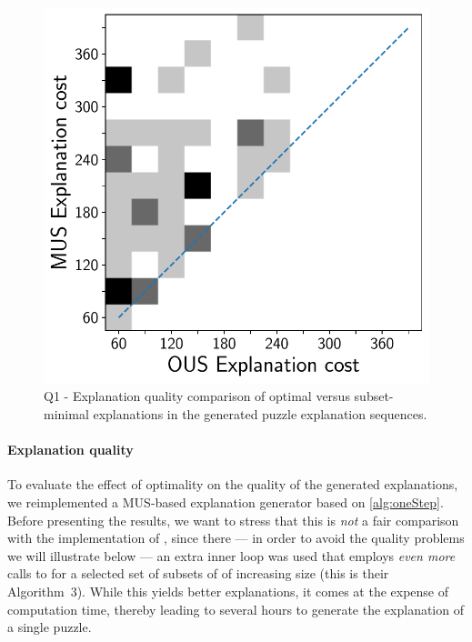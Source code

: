 \begin{figure}[t]
  \centering
  \includegraphics[width=0.55\columnwidth]{figures_post_paper/heatmap_costs_mus_cous.pdf}
  \caption{Q1 - Explanation quality comparison of optimal versus subset-minimal explanations in the generated puzzle explanation sequences.}
  \label{fig:rq1_heatmap}
\end{figure}


\paragraph{Explanation quality}\label{paragraph:explanationquality}
To evaluate the effect of optimality on the quality of the generated explanations, we reimplemented a MUS-based explanation generator based on \cref{alg:oneStep}. 
Before presenting the results, we want to stress that this is \emph{not} a fair comparison with the implementation of \citet{ecai/BogaertsGCG20}, since there --- in order to avoid the quality problems we will illustrate below ---  an extra inner loop was used that employs \emph{even more} calls to  for a selected set of subsets of \formulac of increasing size (this is their Algorithm~3). 
While this yields better explanations, it comes at the expense of computation time, thereby leading to several hours to generate the explanation of a single puzzle. 

